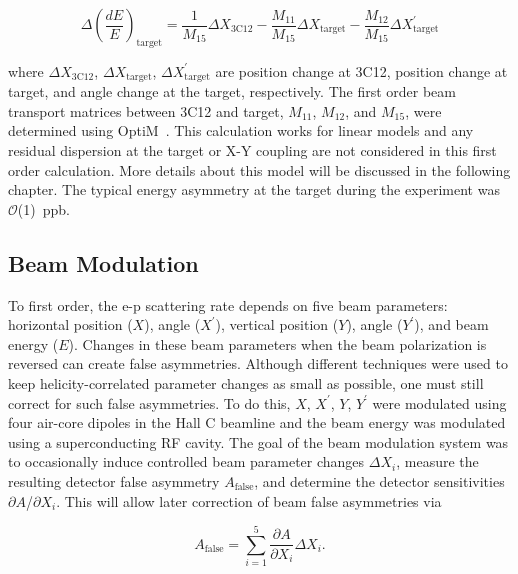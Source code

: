 \begin{equation} \label{equ:energy2}
\Delta\left(\frac{dE}{E} \right)_{\textrm{target}} = \frac{1}{M_{15}}\Delta X_{\textrm{3C12}} - \frac{M_{11}}{M_{15}}\Delta X_{\textrm{target}} - \frac{M_{12}}{M_{15}}\Delta X^{\prime}_{\textrm{target}}
\end{equation}

\noindent
where $\Delta X_{\textrm{3C12}}$, $\Delta X_{\textrm{target}}$, $\Delta X^{\prime}_{\textrm{target}}$ are position change at 3C12, position change at target, and angle change at the target, respectively. The first order beam transport matrices between 3C12 and target, $M_{11}$, $M_{12}$, and $M_{15}$, were determined using OptiM~\cite{OPTIM}. This calculation works for linear models and any residual dispersion at the target or X-Y coupling are not considered in this first order calculation. More details about this model will be discussed in the following chapter. The typical energy asymmetry at the target during the experiment was $\mathcal{O}$(1)~ppb. 

\subsection{Beam Modulation}%
\label{Beam Modulation Experiment}

To first order, the e-p scattering rate depends on five beam parameters: horizontal position ($X$), angle ($X^\prime$), vertical position ($Y$), angle ($Y^\prime$), and beam energy ($E$). Changes in these beam parameters when the beam polarization is reversed can create false asymmetries. Although different techniques were used to keep helicity-correlated parameter changes as small as possible, one must still correct for such false asymmetries. To do this, $X$, $X^{\prime}$, $Y$, $Y^{\prime}$ were modulated using four air-core dipoles in the Hall C beamline and the beam energy was modulated using a superconducting RF cavity. The goal of the beam modulation system was to occasionally induce controlled beam parameter changes $\Delta X_{i}$, measure the resulting detector false asymmetry $A_{\textrm{false}}$, and determine the detector sensitivities $\partial A$/$\partial X_{i}$. This will allow later correction of beam false asymmetries via 

\begin{equation} \label{equ:bm1}
A_{\textrm{false}} = \sum^{5}_{i=1}\frac{ \partial A }{ \partial X_{i} } \Delta X_{i}.
\end{equation}

